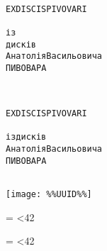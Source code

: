 \documentclass[10pt]{article}
\makeatletter
\newcommand{\myrepeat}[2]{%
  \begingroup
  \my@repeat@count=\z@
  \@whilenum\my@repeat@count<#1\do{#2\advance\my@repeat@count\@ne}%
  \endgroup
}
\makeatother
\begin{document}
\thispagestyle{empty} %

\begin{addmargin}[10em]{0em}
\begin{alltt}
\rmfamily
~~~~~~~~~~~~~~~~~~~~
 EX DISCIS PIVOVARI
~~~~~~~~~~~~~~~~~~~~
        із 
      дисків
Анатолія Васильовича
  П И В О В А Р А
~~~~~~~~~~~~~~~~~~~~











~~~~~~~~~~~~~~~~~~~~
 EX DISCIS PIVOVARI
~~~~~~~~~~~~~~~~~~~~
     із дисків
Анатолія Васильовича
  П И В О В А Р А
~~~~~~~~~~~~~~~~~~~~
\end{alltt}
\end{addmargin}

\begin{center}
\vspace{5mm}
\texttt{[image: \%\%UUID\%\%]}

\vspace{3mm}
\begin{addmargin}[10mm]{0em}

\centerline{\myrepeat{42}{\textasciitilde}}

\parbox[c][15mm][c]{90mm}{
\begin{center}
\end{center}
}
\vspace{0.5mm}

\centerline{\myrepeat{42}{\textasciitilde}}

\end{addmargin}
\end{center}
\end{document}
